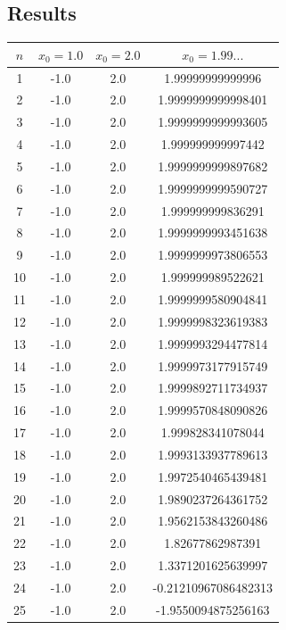 \documentclass[a4paper, 12pt]{article}
\begin{document}
\subsection{Results}
\begin{longtable}[H]{cccc}
\toprule
$n$ & $x_0 = 1.0$ & $x_0 = 2.0$ & $x_0 = 1.99...$ \\ \midrule \endhead
1  & -1.0 & 2.0 & 1.99999999999996     \\ \midrule
2  & -1.0 & 2.0 & 1.9999999999998401   \\ \midrule
3  & -1.0 & 2.0 & 1.9999999999993605   \\ \midrule
4  & -1.0 & 2.0 & 1.999999999997442    \\ \midrule
5  & -1.0 & 2.0 & 1.9999999999897682   \\ \midrule
6  & -1.0 & 2.0 & 1.9999999999590727   \\ \midrule
7  & -1.0 & 2.0 & 1.999999999836291    \\ \midrule
8  & -1.0 & 2.0 & 1.9999999993451638   \\ \midrule
9  & -1.0 & 2.0 & 1.9999999973806553   \\ \midrule
10 & -1.0 & 2.0 & 1.999999989522621    \\ \midrule
11 & -1.0 & 2.0 & 1.9999999580904841   \\ \midrule
12 & -1.0 & 2.0 & 1.9999998323619383   \\ \midrule
13 & -1.0 & 2.0 & 1.9999993294477814   \\ \midrule
14 & -1.0 & 2.0 & 1.9999973177915749   \\ \midrule
15 & -1.0 & 2.0 & 1.9999892711734937   \\ \midrule
16 & -1.0 & 2.0 & 1.9999570848090826   \\ \midrule
17 & -1.0 & 2.0 & 1.999828341078044    \\ \midrule
18 & -1.0 & 2.0 & 1.9993133937789613   \\ \midrule
19 & -1.0 & 2.0 & 1.9972540465439481   \\ \midrule
20 & -1.0 & 2.0 & 1.9890237264361752   \\ \midrule
21 & -1.0 & 2.0 & 1.9562153843260486   \\ \midrule
22 & -1.0 & 2.0 & 1.82677862987391     \\ \midrule
23 & -1.0 & 2.0 & 1.3371201625639997   \\ \midrule
24 & -1.0 & 2.0 & -0.21210967086482313 \\ \midrule
25 & -1.0 & 2.0 & -1.9550094875256163  \\ \midrule

\end{longtable}
\end{document}
